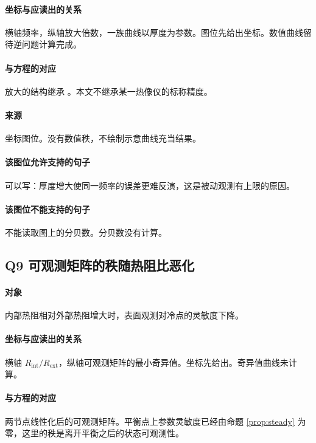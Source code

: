 \paragraph{坐标与应读出的关系}
横轴频率，纵轴放大倍数，一族曲线以厚度为参数。图位先给出坐标。数值曲线留待逆问题计算完成。

\paragraph{与方程的对应}
放大的结构继承 \cite{ozisik2000}。本文不继承某一热像仪的标称精度。

\paragraph{来源}
坐标图位。没有数值秩，不绘制示意曲线充当结果。

\paragraph{该图位允许支持的句子}
可以写：厚度增大使同一频率的误差更难反演，这是被动观测有上限的原因。

\paragraph{该图位不能支持的句子}
不能读取图上的分贝数。分贝数没有计算。

\subsection{Q9 可观测矩阵的秩随热阻比恶化}
\paragraph{对象}
内部热阻相对外部热阻增大时，表面观测对冷点的灵敏度下降。

\paragraph{坐标与应读出的关系}
横轴 $R_{\mathrm{int}}/R_{\mathrm{ext}}$，纵轴可观测矩阵的最小奇异值。坐标先给出。奇异值曲线未计算。

\paragraph{与方程的对应}
两节点线性化后的可观测矩阵。平衡点上参数灵敏度已经由命题 \ref{prop:steady} 为零，这里的秩是离开平衡之后的状态可观测性。

